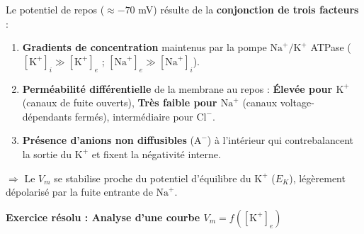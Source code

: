 \documentclass[11pt]{article}
\begin{document}
\begin{aretenir}
Le potentiel de repos ($\approx -70$ mV) résulte de la \textbf{conjonction de trois facteurs} :
\begin{enumerate}
    \item \textbf{Gradients de concentration} maintenus par la pompe $\text{Na}^+/\text{K}^+$ ATPase ($[\text{K}^+]_i \gg [\text{K}^+]_e$ ; $[\text{Na}^+]_e \gg [\text{Na}^+]_i$).
    \item \textbf{Perméabilité différentielle} de la membrane au repos : \textbf{Élevée pour $\text{K}^+$} (canaux de fuite ouverts), \textbf{Très faible pour $\text{Na}^+$} (canaux voltage-dépendants fermés), intermédiaire pour $\text{Cl}^-$.
    \item \textbf{Présence d'anions non diffusibles} ($\text{A}^-$) à l'intérieur qui contrebalancent la sortie du $\text{K}^+$ et fixent la négativité interne.
\end{enumerate}
$\Rightarrow$ Le $V_m$ se stabilise proche du potentiel d'équilibre du $\text{K}^+$ ($E_K$), légèrement dépolarisé par la fuite entrante de $\text{Na}^+$.
\end{aretenir}

\textbf{Exercice résolu : Analyse d'une courbe $V_m = f([\text{K}^+]_e)$}\par
\end{document}
